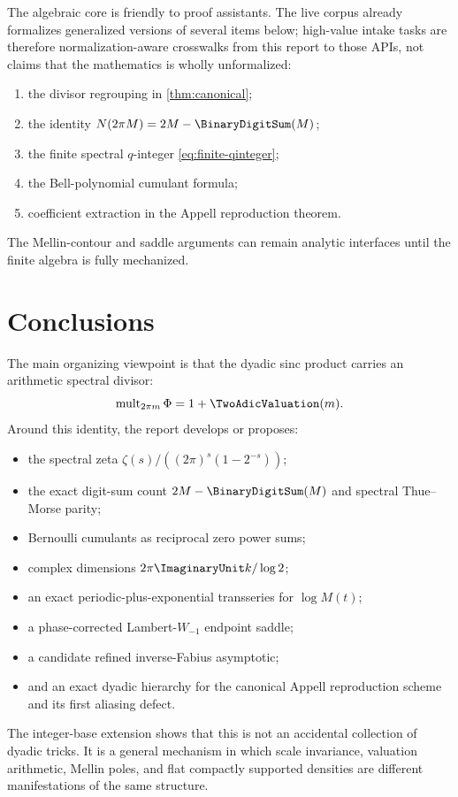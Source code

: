 \documentclass[11pt,oneside]{article}
\theoremstyle{definition}
\theoremstyle{remark}
\begin{document}
The algebraic core is friendly to proof assistants.  The live corpus already
formalizes generalized versions of several items below; high-value intake
tasks are therefore normalization-aware crosswalks from this report to those
APIs, not claims that the mathematics is wholly unformalized:
\begin{enumerate}[label=(\roman*),leftmargin=2.5em]
\item the divisor regrouping in \cref{thm:canonical};
\item the identity \(N(2\pi M)=2M-\BinaryDigitSum(M)\);
\item the finite spectral \(q\)-integer \eqref{eq:finite-qinteger};
\item the Bell-polynomial cumulant formula;
\item coefficient extraction in the Appell reproduction theorem.
\end{enumerate}
The Mellin-contour and saddle arguments can remain analytic interfaces until
the finite algebra is fully mechanized.

\section{Conclusions}

The main organizing viewpoint is that the dyadic sinc product carries an arithmetic
spectral divisor:
\[
 \operatorname{mult}_{2\pi m}\Phi=1+\TwoAdicValuation(m).
\]
Around this identity, the report develops or proposes:
\begin{itemize}[leftmargin=2em]
\item the spectral zeta
      \(\zeta(s)/((2\pi)^s(1-2^{-s}))\);
\item the exact digit-sum count \(2M-\BinaryDigitSum(M)\) and spectral Thue--Morse parity;
\item Bernoulli cumulants as reciprocal zero power sums;
\item complex dimensions \(2\pi\ImaginaryUnit k/\log2\);
\item an exact periodic-plus-exponential transseries for \(\log M(t)\);
\item a phase-corrected Lambert-\(W_{-1}\) endpoint saddle;
\item a candidate refined inverse-Fabius asymptotic;
\item and an exact dyadic hierarchy for the canonical Appell reproduction
      scheme and its first aliasing defect.
\end{itemize}
The integer-base extension shows that this is not an accidental collection of
dyadic tricks.  It is a general mechanism in which scale invariance,
valuation arithmetic, Mellin poles, and flat compactly supported densities
are different manifestations of the same structure.
\end{document}
